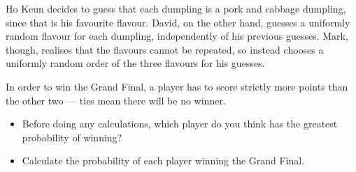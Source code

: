 \documentclass[a4paper,12pt]{article}
\begin{document}
Ho Keun decides to guess that each dumpling is a pork and cabbage dumpling, since that is his favourite flavour. David, on the other hand, guesses a uniformly random flavour for each dumpling, independently of his previous guesses. Mark, though, realises that the flavours cannot be repeated, so instead chooses a uniformly random order of the three flavours for his guesses.

In order to win the Grand Final, a player has to score strictly more points than the other two --- ties mean there will be no winner.

\begin{itemize}
	\item[(a)] Before doing any calculations, which player do you think has the greatest probability of winning?
	\item[(b)] Calculate the probability of each player winning the Grand Final.
\end{itemize}
\end{document}
